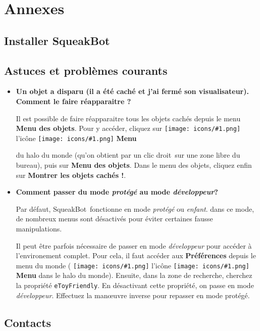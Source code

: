 \documentclass[a4paper,12pt]{book}
\def\appName{SqueakBot}
\def\cd{clic droit~}
\newcommand{\code}[1]{\texttt{#1}}
\newcommand{\important}[1]{\textbf{#1}}
\newcommand{\inserticon}[1]
{
\texttt{[image: icons/\#1.png]}
}
\newcommand{\icon}[2][]
{
\ifthenelse {\equal{#1} {}} {\inserticon{#2}} {l'icône \inserticon{#2} \important{#1}}
}
\begin{document}
\chapter{Annexes}

\section{Installer \appName}

\section{Astuces et problèmes courants}

\begin{itemize}
	\item {\bf Un objet a disparu (il a été caché et j'ai fermé son
	visualisateur). Comment le faire réapparaitre ?}

	Il est possible de faire réapparaitre tous les objets cachés depuis le menu
	\important{Menu des objets}. Pour y accéder, cliquez sur \icon[Menu]{menu}
	du halo du monde (qu'on obtient par un \cd sur une zone libre du bureau),
	puis sur \important{Menu des objets}. Dans le menu des objets, cliquez
	enfin sur \important{Montrer les objets cachés !}.

    \item {\bf Comment passer du mode \emph{protégé} au mode \emph{développeur}?}

	Par défaut, \appName~fonctionne en mode \emph{protégé} ou \emph{enfant}. dans
	ce mode, de nombreux menus sont désactivés pour éviter certaines fausse
	manipulations.
	
	Il peut être parfois nécessaire de passer en mode \emph{développeur} pour
	accéder à l'environement complet. Pour cela, il faut accéder aux
	\important{Préférences} depuis le menu du monde (\icon[Menu]{menu} dans le
	halo du monde). Ensuite, dans la zone de recherche, cherchez la propriété
	\code{eToyFriendly}. En désactivant cette propriété, on passe en mode \emph{
	développeur}. Effectuez la man\oe uvre inverse pour repasser en mode
	protégé.  
	
	\end{itemize}

\section{Contacts}

\printglossaries
\end{document}
